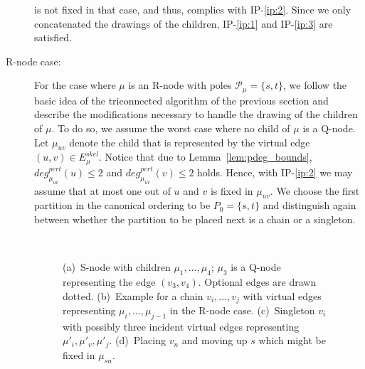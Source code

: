 \documentclass[a4paper,twoside,11pt]{article}
\newcommand{\Eskel}[1]{E^\textit{skel}_{#1}}
\newcommand{\pdeg}[2]{\textit{deg}^{\textit{pert}}_{#1}(#2)}
\newcommand{\IPGeo}{IP-\ref{ip:1}\xspace}
\newcommand{\IPFix}{IP-\ref{ip:2}\xspace}
\newcommand{\IPPort}{IP-\ref{ip:3}\xspace}
\begin{document}
\begin{description}
is not fixed in that case, and thus, complies with \IPFix. Since we
only concatenated the drawings of the children, \IPGeo and \IPPort
are satisfied.
\item[R-node case:] For the case where $\mu$ is an R-node with poles
$\mathcal{P}_{\mu} = \{s, t\}$, we follow the basic idea of the
triconnected algorithm of the previous section and describe the
modifications necessary to handle the drawing of the children of
$\mu$. To do so, we assume the worst case where no child of $\mu$ is
a Q-node. Let $\mu_{uv}$ denote the child that is represented by the
virtual edge $(u,v) \in \Eskel{\mu}$. Notice that due to
Lemma~\ref{lem:pdeg_bounds}, $\pdeg{\mu_{uv}}{u} \leq 2$ and
$\pdeg{\mu_{uv}}{v} \leq 2$ holds. Hence, with \IPFix we may assume
that at most one out of $u$ and $v$ is fixed in $\mu_{uv}$. We
choose the first partition in the canonical ordering to be $P_0 =
\{s, t\}$ and distinguish again between whether the partition to be
placed next is a chain or a singleton.


\begin{figure}[t]
    \centering
    \begin{minipage}[b]{.36\textwidth}
        \centering
    \end{minipage}\hspace{.13\textwidth}
    \begin{minipage}[b]{.36\textwidth}
        \centering
    \end{minipage}\\
    \begin{minipage}[b]{.36\textwidth}
        \centering
    \end{minipage}\hspace{.13\textwidth}
    \begin{minipage}[b]{.36\textwidth}
        \centering
    \end{minipage}
    \caption{
    (a)~S-node with children $\mu_1, \ldots, \mu_4$; $\mu_3$ is a Q-node representing the edge $(v_3, v_4)$. Optional edges are drawn dotted.
    (b)~Example for a chain $v_i, \ldots, v_j$ with virtual edges representing $\mu_i, \ldots, \mu_{j-1}$ in the R-node case.
    (c)~Singleton $v_i$ with possibly three incident virtual edges representing $\mu'_i, \mu'_v, \mu'_j$.
    (d)~Placing $v_n$ and moving up $s$ which might be fixed in $\mu_{sn}$.}
\end{figure}


\end{description}
\end{document}
